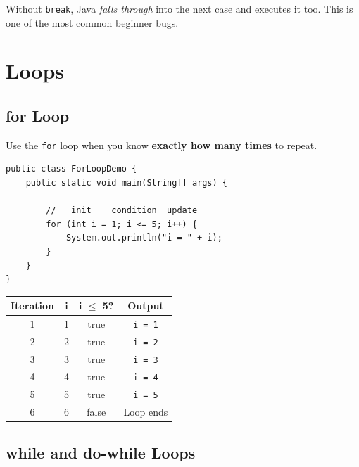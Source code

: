 \documentclass[12pt,a4paper,oneside]{book}
\begin{document}
\begin{warningbox}
Without \texttt{break}, Java \textit{falls through} into the next case and executes it too. This is one of the most common beginner bugs.
\end{warningbox}

\section{Loops}

\subsection{for Loop}

Use the \texttt{for} loop when you know \textbf{exactly how many times} to repeat.

\begin{lstlisting}[caption={for Loop --- Print 1 to 5}]
public class ForLoopDemo {
    public static void main(String[] args) {

        //   init    condition  update
        for (int i = 1; i <= 5; i++) {
            System.out.println("i = " + i);
        }
    }
}
\end{lstlisting}

\begin{dryrun}[Dry Run: for loop i = 1 to 5]
\begin{center}
\begin{tabular}{cccc}
\toprule
\textbf{Iteration} & \textbf{i} & \textbf{i $\leq$ 5?} & \textbf{Output}\\
\midrule
1 & 1 & true  & \texttt{i = 1}\\
2 & 2 & true  & \texttt{i = 2}\\
3 & 3 & true  & \texttt{i = 3}\\
4 & 4 & true  & \texttt{i = 4}\\
5 & 5 & true  & \texttt{i = 5}\\
6 & 6 & false & Loop ends\\
\bottomrule
\end{tabular}
\end{center}
\end{dryrun}

\subsection{while and do-while Loops}
\end{document}
